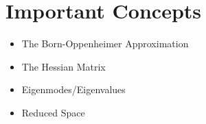 \section{Important Concepts}
\begin{itemize}
\item The Born-Oppenheimer Approximation
\item The Hessian Matrix
\item Eigenmodes/Eigenvalues
\item Reduced Space
\end{itemize}
